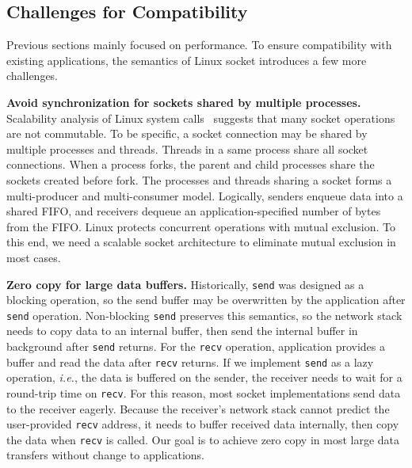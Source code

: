 \subsection{Challenges for Compatibility}
\label{subsec:challenges}

Previous sections mainly focused on performance. To ensure compatibility with existing applications, the semantics of Linux socket introduces a few more challenges.


\textbf{Avoid synchronization for sockets shared by multiple processes.}
Scalability analysis of Linux system calls~\cite{boyd2010analysis} suggests that many socket operations are not commutable. To be specific, a socket connection may be shared by multiple processes and threads. Threads in a same process share all socket connections. When a process forks, the parent and child processes share the sockets created before fork. The processes and threads sharing a socket forms a multi-producer and multi-consumer model. Logically, senders enqueue data into a shared FIFO, and receivers dequeue an application-specified number of bytes from the FIFO. Linux protects concurrent operations with mutual exclusion. To this end, we need a scalable socket architecture to eliminate mutual exclusion in most cases.


\textbf{Zero copy for large data buffers.}
Historically, \texttt{send} was designed as a blocking operation, so the send buffer may be overwritten by the application after \texttt{send} operation.
Non-blocking \texttt{send} preserves this semantics, so the network stack needs to copy data to an internal buffer, then send the internal buffer in background after \texttt{send} returns.
For the \texttt{recv} operation, application provides a buffer and read the data after \texttt{recv} returns.
If we implement \texttt{send} as a lazy operation, \textit{i.e.}, the data is buffered on the sender, the receiver needs to wait for a round-trip time on \texttt{recv}.
For this reason, most socket implementations send data to the receiver eagerly. Because the receiver's network stack cannot predict the user-provided \texttt{recv} address, it needs to buffer received data internally, then copy the data when \texttt{recv} is called.
Our goal is to achieve zero copy in most large data transfers without change to applications.

